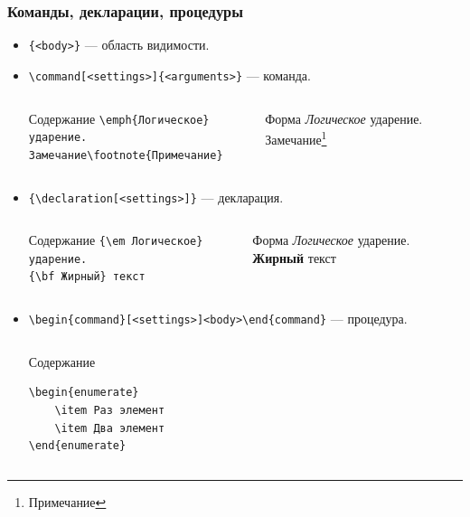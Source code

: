 \begin{frame}
\frametitle{Команды, декларации, процедуры}
\begin{itemize}
\item \verb"{<body>}" --- область видимости.
\item \verb"\command[<settings>]{<arguments>}" --- команда.
    \begin{columns}
            \begin{block}{Содержание}
                \verb"\emph{Логическое} ударение."\\
                \verb"Замечание\footnote{Примечание}"
            \end{block}
        
            \begin{block}{Форма}
                \emph{Логическое} ударение.
                Замечание\footnote{Примечание}
            \end{block}
    \end{columns}

\item \verb"{\declaration[<settings>]}" --- декларация.
    \begin{columns}
            \begin{block}{Содержание}
                \verb"{\em Логическое} ударение."\\
                \verb"{\bf Жирный} текст"
            \end{block}
        
            \begin{block}{Форма}
                {\em Логическое} ударение.
                {\bf Жирный} текст
            \end{block}
    \end{columns}
    
\item \verb"\begin{command}[<settings>]<body>\end{command}" --- процедура.
    \begin{columns}
            \begin{block}{Содержание}
                \begin{verbatim}
\begin{enumerate}                
    \item Раз элемент 
    \item Два элемент 
\end{enumerate}                
                \end{verbatim}
            \end{block}
        

\end{columns}
\end{itemize}
\end{frame}
